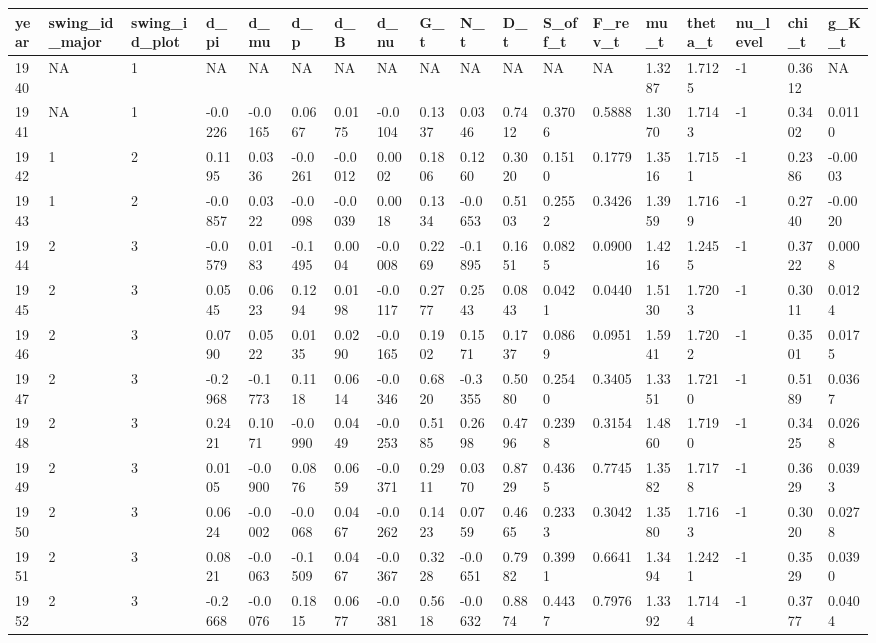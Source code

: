 \begin{tabular}{llllllllllllllllll}
\hline
year & swing\_id\_major & swing\_id\_plot & d\_pi & d\_mu & d\_p & d\_B & d\_nu & G\_t & N\_t & D\_t & S\_off\_t & F\_rev\_t & mu\_t & theta\_t & nu\_level & chi\_t & g\_K\_t \\
\hline
1940 & NA & 1 & NA & NA & NA & NA & NA & NA & NA & NA & NA & NA & 1.3287 & 1.7125 & -1 & 0.3612 & NA \\
1941 & NA & 1 & -0.0226 & -0.0165 & 0.0667 & 0.0175 & -0.0104 & 0.1337 & 0.0346 & 0.7412 & 0.3706 & 0.5888 & 1.3070 & 1.7143 & -1 & 0.3402 & 0.0110 \\
1942 & 1 & 2 & 0.1195 & 0.0336 & -0.0261 & -0.0012 & 0.0002 & 0.1806 & 0.1260 & 0.3020 & 0.1510 & 0.1779 & 1.3516 & 1.7151 & -1 & 0.2386 & -0.0003 \\
1943 & 1 & 2 & -0.0857 & 0.0322 & -0.0098 & -0.0039 & 0.0018 & 0.1334 & -0.0653 & 0.5103 & 0.2552 & 0.3426 & 1.3959 & 1.7169 & -1 & 0.2740 & -0.0020 \\
1944 & 2 & 3 & -0.0579 & 0.0183 & -0.1495 & 0.0004 & -0.0008 & 0.2269 & -0.1895 & 0.1651 & 0.0825 & 0.0900 & 1.4216 & 1.2455 & -1 & 0.3722 & 0.0008 \\
1945 & 2 & 3 & 0.0545 & 0.0623 & 0.1294 & 0.0198 & -0.0117 & 0.2777 & 0.2543 & 0.0843 & 0.0421 & 0.0440 & 1.5130 & 1.7203 & -1 & 0.3011 & 0.0124 \\
1946 & 2 & 3 & 0.0790 & 0.0522 & 0.0135 & 0.0290 & -0.0165 & 0.1902 & 0.1571 & 0.1737 & 0.0869 & 0.0951 & 1.5941 & 1.7202 & -1 & 0.3501 & 0.0175 \\
1947 & 2 & 3 & -0.2968 & -0.1773 & 0.1118 & 0.0614 & -0.0346 & 0.6820 & -0.3355 & 0.5080 & 0.2540 & 0.3405 & 1.3351 & 1.7210 & -1 & 0.5189 & 0.0367 \\
1948 & 2 & 3 & 0.2421 & 0.1071 & -0.0990 & 0.0449 & -0.0253 & 0.5185 & 0.2698 & 0.4796 & 0.2398 & 0.3154 & 1.4860 & 1.7190 & -1 & 0.3425 & 0.0268 \\
1949 & 2 & 3 & 0.0105 & -0.0900 & 0.0876 & 0.0659 & -0.0371 & 0.2911 & 0.0370 & 0.8729 & 0.4365 & 0.7745 & 1.3582 & 1.7178 & -1 & 0.3629 & 0.0393 \\
1950 & 2 & 3 & 0.0624 & -0.0002 & -0.0068 & 0.0467 & -0.0262 & 0.1423 & 0.0759 & 0.4665 & 0.2333 & 0.3042 & 1.3580 & 1.7163 & -1 & 0.3020 & 0.0278 \\
1951 & 2 & 3 & 0.0821 & -0.0063 & -0.1509 & 0.0467 & -0.0367 & 0.3228 & -0.0651 & 0.7982 & 0.3991 & 0.6641 & 1.3494 & 1.2421 & -1 & 0.3529 & 0.0390 \\
1952 & 2 & 3 & -0.2668 & -0.0076 & 0.1815 & 0.0677 & -0.0381 & 0.5618 & -0.0632 & 0.8874 & 0.4437 & 0.7976 & 1.3392 & 1.7144 & -1 & 0.3777 & 0.0404 \\

\end{tabular}
